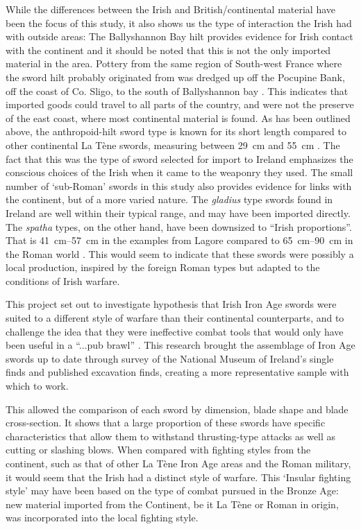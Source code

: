 While the differences between the Irish and British/continental material have been the focus of this study, it also shows us the type of interaction the Irish had with outside areas: 
The Ballyshannon Bay hilt provides evidence for Irish contact with the continent and it should be noted that this is not the only imported material in the area. 
Pottery from the same region of South-west France where the sword hilt probably originated from was dredged up off the Pocupine Bank, off the coast of Co. Sligo, to the south of Ballyshannon bay \parencites[193]{OBrien2009}[25\psq]{CahillWilson2014}. 
This indicates that imported goods could travel to all parts of the country, and were not the preserve of the east coast, where most continental material is found.
As has been outlined above, the anthropoid-hilt sword type is known for its short length compared to other continental La Tène swords, measuring between \SI{29}{\cm} and \SI{55}{\cm} \parencite[69]{Pleiner1993}. 
The fact that this was the type of sword selected for import to Ireland emphasizes the conscious choices of the Irish when it came to the weaponry they used. 
The small number of ‘sub-Roman’ swords in this study also provides evidence for links with the continent, but of a more varied nature. 
The \emph{gladius} type swords found in Ireland are well within their typical range, and may have been imported directly. 
The \emph{spatha} types, on the other hand, have been downsized to “Irish proportions”. That is \SIrange{41}{57}{\cm} in the examples from Lagore compared to \SIrange{65}{90}{\cm} in the Roman world \parencite[48]{Dixon1997}. 
This would seem to indicate that these swords were possibly a local production, inspired by the foreign Roman types but adapted to the conditions of Irish warfare.


This project set out to investigate hypothesis that Irish Iron Age swords were suited to a different style of warfare than their continental counterparts, and to challenge the idea that they were ineffective combat tools that would only have been useful in a “...pub brawl” \parencite[65]{Scott1990}. 
This research brought the assemblage of Iron Age swords up to date through survey of the National Museum of Ireland’s single finds and published excavation finds, creating a more representative sample with which to work. 

This allowed the comparison of each sword by dimension, blade shape and blade cross-section. 
It shows that a large proportion of these swords have specific characteristics that allow them to withstand thrusting-type attacks as well as cutting or slashing blows. 
When compared with fighting styles from the continent, such as that of other La Tène Iron Age areas and the Roman military, it would seem that the Irish had a distinct style of warfare.
This ‘Insular fighting style’ may have been based on the type of combat pursued in the Bronze Age: new material imported from the Continent, be it La Tène or Roman in origin, was incorporated into the local fighting style. 

